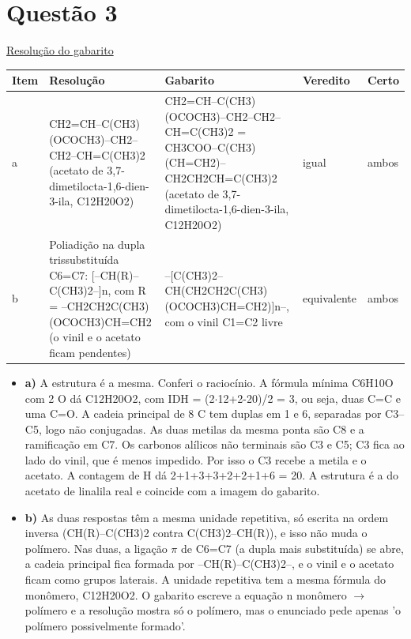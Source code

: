 \documentclass{article}%
\begin{document}
\section*{Questão 3}%
\href{https://poliedroresolve.sistemapoliedro.com.br/vestibulares/ime/2026/ime-2-fase-dia-3-25-10-2025-2-fase-dia-3/dissertativa-3-quimica-2-fase-dia-3-ime-2026}{Resolução do gabarito}\par\smallskip%
\begin{longtable}{@{}p{} p{} p{} p{} p{}@{}}\toprule Item & Resolução & Gabarito & Veredito & Certo \\ \midrule
a & CH2=CH--C(CH3)(OCOCH3)--CH2--CH2--CH=C(CH3)2 (acetato de 3,7{-}dimetilocta{-}1,6{-}dien{-}3{-}ila, C12H20O2) & CH2=CH--C(CH3)(OCOCH3)--CH2--CH2--CH=C(CH3)2 = CH3COO--C(CH3)(CH=CH2)--CH2CH2CH=C(CH3)2 (acetato de 3,7{-}dimetilocta{-}1,6{-}dien{-}3{-}ila, C12H20O2) & igual & ambos \\
b & Poliadição na dupla trissubstituída C6=C7: {[}--CH(R)--C(CH3)2--{]}n, com R = --CH2CH2C(CH3)(OCOCH3)CH=CH2 (o vinil e o acetato ficam pendentes) & --{[}C(CH3)2--CH(CH2CH2C(CH3)(OCOCH3)CH=CH2){]}n--, com o vinil C1=C2 livre & equivalente & ambos \\
\bottomrule\end{longtable}%
\begin{itemize}%
\item%
\textbf{a)} A estrutura é a mesma. Conferi o raciocínio. A fórmula mínima C6H10O com 2 O dá C12H20O2, com IDH = (2$\cdot$12+2-20)/2 = 3, ou seja, duas C=C e uma C=O. A cadeia principal de 8 C tem duplas em 1 e 6, separadas por C3--C5, logo não conjugadas. As duas metilas da mesma ponta são C8 e a ramificação em C7. Os carbonos alílicos não terminais são C3 e C5; C3 fica ao lado do vinil, que é menos impedido. Por isso o C3 recebe a metila e o acetato. A contagem de H dá 2+1+3+3+2+2+1+6 = 20. A estrutura é a do acetato de linalila real e coincide com a imagem do gabarito.%
\item%
\textbf{b)} As duas respostas têm a mesma unidade repetitiva, só escrita na ordem inversa (CH(R)--C(CH3)2 contra C(CH3)2--CH(R)), e isso não muda o polímero. Nas duas, a ligação $\pi$ de C6=C7 (a dupla mais substituída) se abre, a cadeia principal fica formada por --CH(R)--C(CH3)2--, e o vinil e o acetato ficam como grupos laterais. A unidade repetitiva tem a mesma fórmula do monômero, C12H20O2. O gabarito escreve a equação n monômero $\to$ polímero e a resolução mostra só o polímero, mas o enunciado pede apenas 'o polímero possivelmente formado'.%
\end{itemize}%
\end{document}
